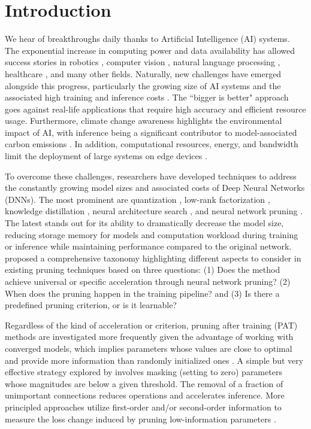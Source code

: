 \section{Introduction}

We hear of breakthroughs daily thanks to Artificial Intelligence (AI) systems. The exponential increase in computing power and data availability has allowed success stories in robotics \cite{soori2023artificial}, computer vision \cite{khan2020machine}, natural language processing \cite{torfi2020natural}, healthcare \cite{habehh2021machine}, and many other fields. Naturally, new challenges have emerged alongside this progress, particularly the growing size of AI systems and the associated high training and inference costs \cite{han2015learning}. The ``bigger is better" approach goes against real-life applications that require high accuracy and efficient resource usage. Furthermore, climate change awareness highlights the environmental impact of AI, with inference being a significant contributor to model-associated carbon emissions \cite{wu2022sustainable, chien2023reducing}. In addition, computational resources, energy, and bandwidth limit the deployment of large systems on edge devices \cite{cheng2024survey}.

To overcome these challenges, researchers have developed techniques to address the constantly growing model sizes and associated costs of Deep Neural Networks (DNNs). The most prominent are quantization \cite{dettmers2023qlora}, low-rank factorization \cite{denton2014exploiting}, knowledge distillation \cite{xu2024survey}, neural architecture search \cite{zhang2021idarts}, and neural network pruning \cite{cheng2024survey}. The latest stands out for its ability to dramatically decrease the model size, reducing storage memory for models and computation workload during training or inference while maintaining performance compared to the original network. \citet{cheng2024survey} proposed a comprehensive taxonomy highlighting different aspects to consider in existing pruning techniques based on three questions: (1) Does the method achieve universal or specific acceleration through neural network pruning? (2) When does the pruning happen in the training pipeline? and (3) Is there a predefined pruning criterion, or is it learnable?

Regardless of the kind of acceleration or criterion, pruning after training (PAT) methods are investigated more frequently given the advantage of working with converged models, which implies parameters whose values are close to optimal and provide more information than randomly initialized ones \cite{kumar2024no}. A simple but very effective strategy explored by \citet{han2015learning} involves masking (setting to zero) parameters whose magnitudes are below a given threshold. The removal of a fraction of unimportant connections reduces operations and accelerates inference. More principled approaches utilize first-order and/or second-order information to measure the loss change induced by pruning low-information parameters \cite{lecun1989optimal, hassibi1992second}.

